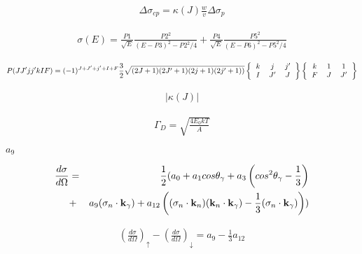 \documentclass[11pt,a4paper]{jsarticle}
\begin{document}
%


\begin{eqnarray}
\Delta \sigma _{cp}= \kappa (J) \frac{w}{v}\Delta \sigma_{p}
\nonumber
\end{eqnarray}




\begin{eqnarray}
\sigma(E)=\frac{P1}{\sqrt{E}}\frac{P2^{2}}{(E-P3)^2-P2^2/4}+\frac{P4}{\sqrt{E}}\frac{P5^{2}}{(E-P6)^2-P5^2/4}
\nonumber
\end{eqnarray}




\begin{eqnarray}
P(JJ'jj'kIF)=(-1)^{J+J'+j'+I+F}\frac{3}{2}\sqrt{(2J+1)(2J'+1)(2j+1)(2j'+1))}
\left\{
\begin{tabular}{ccc}
$k$ & $ j$ & $j' $\\
$I$ & $J'$ & $J $\\
\end{tabular}
\right\} \left\{
\begin{tabular}{ccc}
$k$ &  1 & 1  \\
$F$ &  $J$ & $J'$  \\
\end{tabular}
\right\}   \nonumber
\end{eqnarray}

\begin{eqnarray}
| \kappa(J) |
\end{eqnarray}

\begin{eqnarray}
\Gamma_{D} = \sqrt{\frac{4E_0 k T}{A}}
\end{eqnarray}









$a_9$


\begin{eqnarray}
\frac{d\sigma}{d\Omega} &=& \frac{1}{2}  ( a_0+ a_1 cos \theta_\gamma + a_3\left(cos^2 \theta_\gamma -\frac{1}{3} \right)  \nonumber \\ 
&+&a_9({\bf \sigma}_n \cdot {\bf k}_\gamma) + a_{12}\left(({\bf \sigma}_n \cdot {\bf k}_n)({\bf k}_n \cdot {\bf k}_\gamma) -\frac{1}{3}({\bf \sigma}_n \cdot {\bf k}_\gamma) \right)
)
\end{eqnarray}

\begin{eqnarray}
\left(\frac{d\sigma}{d\Omega}\right)_\uparrow - \left(\frac{d\sigma}{d\Omega}\right)_\downarrow
=a_9-\frac13a_{12}
\nonumber
\end{eqnarray}
\end{document}
